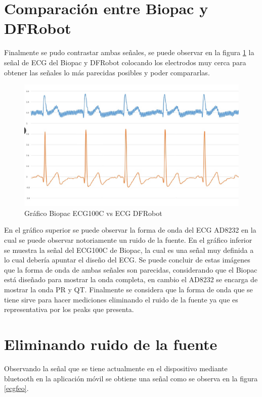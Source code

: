 \newpage
\section{Comparación entre Biopac y DFRobot}
Finalmente se pudo contrastar ambas señales, se puede observar en la figura \ref{graficos} la señal de ECG del Biopac y DFRobot colocando los electrodos muy cerca para obtener las señales lo más parecidas posibles y poder compararlas. 

\begin{figure}[H]
\centering
\includegraphics[scale=0.45]{figuras/ecg/biovsdf.jpg}
\caption{Gráfico Biopac ECG100C vs ECG DFRobot}
\label{graficos}
\end{figure}

En el gráfico superior se puede observar la forma de onda del ECG AD8232 en la cual se puede observar notoriamente un ruido de la fuente. En el gráfico inferior se muestra la señal del ECG100C de Biopac, la cual es una señal muy definida a lo cual debería apuntar el diseño del ECG.
Se puede concluir de estas imágenes que la forma de onda de ambas señales son parecidas, considerando que el Biopac está diseñado para mostrar la onda completa, en cambio el AD8232 se encarga de mostrar la onda PR y QT. 
Finalmente se considera que la forma de onda que se tiene sirve para hacer mediciones eliminando el ruido de la fuente ya que es representativa por los peaks que presenta. 

\section{Eliminando ruido de la fuente}
Observando la señal que se tiene actualmente en el dispositivo mediante bluetooth en la aplicación móvil se obtiene una señal como se observa en la figura \ref{ecgfeo}.

